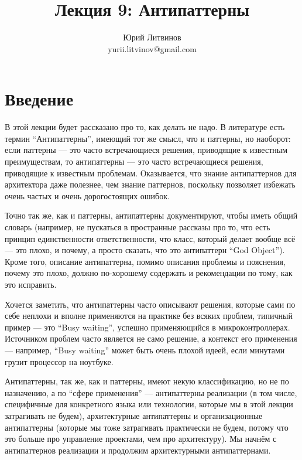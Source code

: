 \documentclass[a5paper]{article}
\title{Лекция 9: Антипаттерны}
\author{Юрий Литвинов\\\small{yurii.litvinov@gmail.com}}
\date{}
\begin{document}
\maketitle
\thispagestyle{empty}

\section{Введение}

В этой лекции будет рассказано про то, как делать не надо. В литературе есть термин ``Антипаттерны'', имеющий тот же смысл, что и паттерны, но наоборот: если паттерны --- это часто встречающиеся решения, приводящие к известным преимуществам, то антипаттерны --- это часто встречающиеся решения, приводящие к известным проблемам. Оказывается, что знание антипаттернов для архитектора даже полезнее, чем знание паттернов, поскольку позволяет избежать очень частых и очень дорогостоящих ошибок.

Точно так же, как и паттерны, антипаттерны документируют, чтобы иметь общий словарь (например, не пускаться в пространные рассказы про то, что есть принцип единственности ответственности, что класс, который делает вообще всё --- это плохо, и почему, а просто сказать, что это антипаттерн ``God Object''). Кроме того, описание антипаттерна, помимо описания проблемы и пояснения, почему это плохо, должно по-хорошему содержать и рекомендации по тому, как это исправить. 

Хочется заметить, что антипаттерны часто описывают решения, которые сами по себе неплохи и вполне применяются на практике без всяких проблем, типичный пример --- это ``Busy waiting'', успешно применяющийся в микроконтроллерах. Источником проблем часто является не само решение, а контекст его применения --- например, ``Busy waiting'' может быть очень плохой идеей, если минутами грузит процессор на ноутбуке.

Антипаттерны, так же, как и паттерны, имеют некую классификацию, но не по назначению, а по ``сфере применения'' --- антипаттерны реализации (в том числе, специфичные для конкретного языка или технологии, которые мы в этой лекции затрагивать не будем), архитектурные антипаттерны и организационные антипаттерны (которые мы тоже затрагивать практически не будем, потому что это больше про управление проектами, чем про архитектуру). Мы начнём с антипаттернов реализации и продолжим архитектурными антипаттернами.
\end{document}
